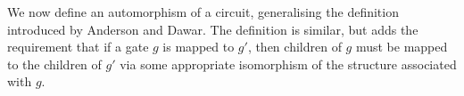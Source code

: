 \documentclass[../paper.tex]{subfiles}
\begin{document}


We now define an automorphism of a circuit, generalising the definition
introduced by Anderson and Dawar. The definition is similar, but adds the
requirement that if a gate $g$ is mapped to $g'$, then children of $g$ must be
mapped to the children of $g'$ via some appropriate isomorphism of the structure
associated with $g$.
\end{document}
